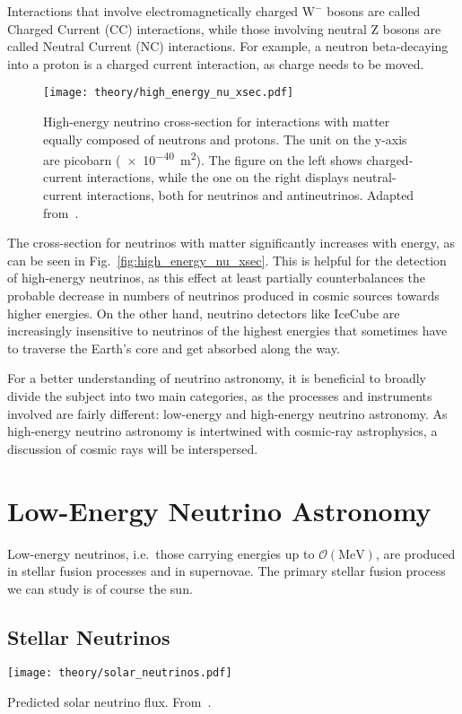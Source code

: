Interactions that involve electromagnetically charged $\text{W}^-$ bosons are called Charged Current (CC) interactions, while those involving neutral Z bosons are called Neutral Current (NC) interactions. For example, a neutron beta-decaying into a proton is a charged current interaction, as charge needs to be moved.

\begin{figure}[htb]
    \texttt{[image: theory/high\_energy\_nu\_xsec.pdf]}
    \caption[High-energy neutrino cross-section]{High-energy neutrino cross-section for interactions with matter equally composed of neutrons and protons. The unit on the y-axis are picobarn (\SI{e-40}{\m\squared}). The figure on the left shows charged-current interactions, while the one on the right displays neutral-current interactions, both for neutrinos and antineutrinos. Adapted from~\cite{CooperSarkar2011}.}
\end{figure}

The cross-section for neutrinos with matter significantly increases with energy, as can be seen in Fig.~\ref{fig:high_energy_nu_xsec}. This is helpful for the detection of high-energy neutrinos, as this effect at least partially counterbalances the probable decrease in numbers of neutrinos produced in cosmic sources towards higher energies. On the other hand, neutrino detectors like IceCube are increasingly insensitive to neutrinos of the highest energies that sometimes have to traverse the Earth's core and get absorbed along the way.

\pagebreak

For a better understanding of neutrino astronomy, it is beneficial to broadly divide the subject into two main categories, as the processes and instruments involved are fairly different: low-energy and high-energy neutrino astronomy. As high-energy neutrino astronomy is intertwined with cosmic-ray astrophysics, a discussion of cosmic rays will be interspersed.

\section{Low-Energy Neutrino Astronomy}
Low-energy neutrinos, i.e.\ those carrying energies up to $\mathcal{O}(\unit{\mega\eV})$, are produced in stellar fusion processes and in supernovae. The primary stellar fusion process we can study is of course the sun.

\subsection{Stellar Neutrinos}
\begin{marginfigure}
    \texttt{[image: theory/solar\_neutrinos.pdf]}
    \caption[Predicted solar neutrino flux]{Predicted solar neutrino flux. From~\cite{Agostini2018}.}
\end{marginfigure}

